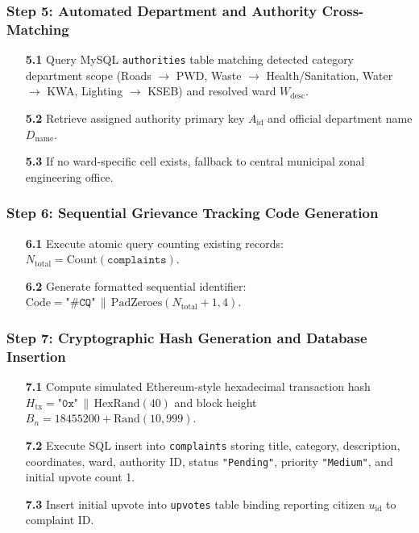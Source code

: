 \documentclass[12pt,a4paper]{report}
\begin{document}
\subsubsection*{Step 5: Automated Department and Authority Cross-Matching}
\begin{enumerate}
  \item[\textbf{5.1}] Query MySQL \texttt{authorities} table matching detected category department scope (Roads $\to$ PWD, Waste $\to$ Health/Sanitation, Water $\to$ KWA, Lighting $\to$ KSEB) and resolved ward $W_{\text{desc}}$.
  \item[\textbf{5.2}] Retrieve assigned authority primary key $A_{\text{id}}$ and official department name $D_{\text{name}}$.
  \item[\textbf{5.3}] If no ward-specific cell exists, fallback to central municipal zonal engineering office.
\end{enumerate}

\subsubsection*{Step 6: Sequential Grievance Tracking Code Generation}
\begin{enumerate}
  \item[\textbf{6.1}] Execute atomic query counting existing records: $N_{\text{total}} = \mathrm{Count}(\texttt{complaints})$.
  \item[\textbf{6.2}] Generate formatted sequential identifier: $\mathrm{Code} = \texttt{"\#CQ"} \,\|\, \mathrm{PadZeroes}(N_{\text{total}} + 1, 4)$.
\end{enumerate}

\subsubsection*{Step 7: Cryptographic Hash Generation and Database Insertion}
\begin{enumerate}
  \item[\textbf{7.1}] Compute simulated Ethereum-style hexadecimal transaction hash $H_{\text{tx}} = \texttt{"0x"} \,\|\, \mathrm{HexRand}(40)$ and block height $B_n = 18455200 + \mathrm{Rand}(10, 999)$.
  \item[\textbf{7.2}] Execute SQL insert into \texttt{complaints} storing title, category, description, coordinates, ward, authority ID, status \texttt{"Pending"}, priority \texttt{"Medium"}, and initial upvote count 1.
  \item[\textbf{7.3}] Insert initial upvote into \texttt{upvotes} table binding reporting citizen $u_{\text{id}}$ to complaint ID.
\end{enumerate}
\end{document}
